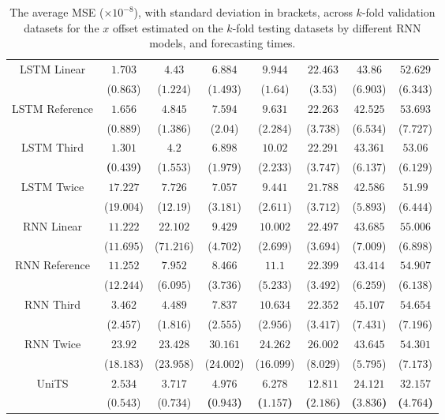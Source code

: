 \begin{table}[!ht]
{\begin{tabular}{|c|c|c|c|c|c|c|c|}
			\multirow{2}{*}{LSTM Linear} & $1.703$ & $4.43$ & $6.884$ & $9.944$ & $22.463$ & $43.86$ & $52.629$ \\
			 & ($0.863$) & ($1.224$) & ($1.493$) & ($1.64$) & ($3.53$) & ($6.903$) & ($6.343$) \\ \hline
			\multirow{2}{*}{LSTM Reference} & $1.656$ & $4.845$ & $7.594$ & $9.631$ & $22.263$ & $42.525$ & $53.693$ \\
			 & ($0.889$) & ($1.386$) & ($2.04$) & ($2.284$) & ($3.738$) & ($6.534$) & ($7.727$) \\ \hline
			\multirow{2}{*}{LSTM Third} & $\mathbf{1.301}$ & $4.2$ & $6.898$ & $10.02$ & $22.291$ & $43.361$ & $53.06$ \\
			 & \textbf{(}$\mathbf{0.439}$\textbf{)} & ($1.553$) & ($1.979$) & ($2.233$) & ($3.747$) & ($6.137$) & ($6.129$) \\ \hline
			\multirow{2}{*}{LSTM Twice} & $17.227$ & $7.726$ & $7.057$ & $9.441$ & $21.788$ & $42.586$ & $51.99$ \\
			 & ($19.004$) & ($12.19$) & ($3.181$) & ($2.611$) & ($3.712$) & ($5.893$) & ($6.444$) \\ \hline
			\multirow{2}{*}{RNN Linear} & $11.222$ & $22.102$ & $9.429$ & $10.002$ & $22.497$ & $43.685$ & $55.006$ \\
			 & ($11.695$) & ($71.216$) & ($4.702$) & ($2.699$) & ($3.694$) & ($7.009$) & ($6.898$) \\ \hline
			\multirow{2}{*}{RNN Reference} & $11.252$ & $7.952$ & $8.466$ & $11.1$ & $22.399$ & $43.414$ & $54.907$ \\
			 & ($12.244$) & ($6.095$) & ($3.736$) & ($5.233$) & ($3.492$) & ($6.259$) & ($6.138$) \\ \hline
			\multirow{2}{*}{RNN Third} & $3.462$ & $4.489$ & $7.837$ & $10.634$ & $22.352$ & $45.107$ & $54.654$ \\
			 & ($2.457$) & ($1.816$) & ($2.555$) & ($2.956$) & ($3.417$) & ($7.431$) & ($7.196$) \\ \hline
			\multirow{2}{*}{RNN Twice} & $23.92$ & $23.428$ & $30.161$ & $24.262$ & $26.002$ & $43.645$ & $54.301$ \\
			 & ($18.183$) & ($23.958$) & ($24.002$) & ($16.099$) & ($8.029$) & ($5.795$) & ($7.173$) \\ \hline
			\multirow{2}{*}{UniTS} & $2.534$ & $3.717$ & $\mathbf{4.976}$ & $\mathbf{6.278}$ & $\mathbf{12.811}$ & $\mathbf{24.121}$ & $\mathbf{32.157}$ \\
			 & ($0.543$) & ($0.734$) & \textbf{(}$\mathbf{0.943}$\textbf{)} & \textbf{(}$\mathbf{1.157}$\textbf{)} & \textbf{(}$\mathbf{2.186}$\textbf{)} & \textbf{(}$\mathbf{3.836}$\textbf{)} & \textbf{(}$\mathbf{4.764}$\textbf{)} \\ \hline
		\end{tabular}
	}
	\caption{The average MSE ($\times 10^{-8}$), with standard deviation in brackets, across $k$-fold validation datasets for the $x$ offset estimated on the $k$-fold testing datasets by different RNN models, and forecasting times.}
	\label{tab:all_longitude_no_abs_MSE}
\end{table}

